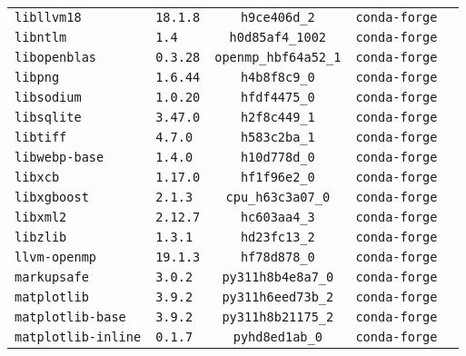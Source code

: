 \begin{longtable}{p{}|l|ccc}
\texttt{libllvm18}                & \texttt{18.1.8}             & \texttt{h9ce406d\_2}       & \texttt{conda-forge}\\
\texttt{libntlm}                  & \texttt{1.4}                & \texttt{h0d85af4\_1002}    & \texttt{conda-forge}\\
\texttt{libopenblas}              & \texttt{0.3.28}             & \texttt{openmp\_hbf64a52\_1} & \texttt{conda-forge}\\
\texttt{libpng}                   & \texttt{1.6.44}             & \texttt{h4b8f8c9\_0}       & \texttt{conda-forge}\\
\texttt{libsodium}                & \texttt{1.0.20}             & \texttt{hfdf4475\_0}       & \texttt{conda-forge}\\
\texttt{libsqlite}                & \texttt{3.47.0}             & \texttt{h2f8c449\_1}       & \texttt{conda-forge}\\
\texttt{libtiff}                  & \texttt{4.7.0}              & \texttt{h583c2ba\_1}       & \texttt{conda-forge}\\
\texttt{libwebp-base}             & \texttt{1.4.0}              & \texttt{h10d778d\_0}       & \texttt{conda-forge}\\
\texttt{libxcb}                   & \texttt{1.17.0}             & \texttt{hf1f96e2\_0}       & \texttt{conda-forge}\\
\texttt{libxgboost}               & \texttt{2.1.3}              & \texttt{cpu\_h63c3a07\_0}  & \texttt{conda-forge}\\
\texttt{libxml2}                  & \texttt{2.12.7}             & \texttt{hc603aa4\_3}       & \texttt{conda-forge}\\
\texttt{libzlib}                  & \texttt{1.3.1}              & \texttt{hd23fc13\_2}       & \texttt{conda-forge}\\
\texttt{llvm-openmp}              & \texttt{19.1.3}             & \texttt{hf78d878\_0}       & \texttt{conda-forge}\\
\texttt{markupsafe}               & \texttt{3.0.2}              & \texttt{py311h8b4e8a7\_0}  & \texttt{conda-forge}\\
\texttt{matplotlib}               & \texttt{3.9.2}              & \texttt{py311h6eed73b\_2}  & \texttt{conda-forge}\\
\texttt{matplotlib-base}          & \texttt{3.9.2}              & \texttt{py311h8b21175\_2}  & \texttt{conda-forge}\\
\texttt{matplotlib-inline}        & \texttt{0.1.7}              & \texttt{pyhd8ed1ab\_0}     & \texttt{conda-forge}\\

\end{longtable}

